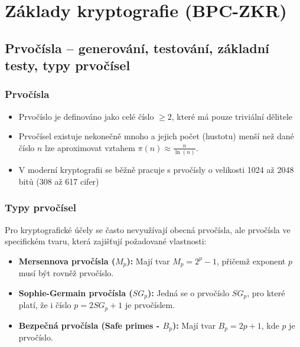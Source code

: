 \section{Základy kryptografie (BPC-ZKR)}
    \subsection{Prvočísla – generování, testování, základní testy, typy prvočísel}
        \subsubsection{Prvočísla}
            \begin{itemize}
                \item Prvočíslo je definováno jako celé číslo $\geq 2$, které má pouze triviální dělitele
                \item Prvočísel existuje nekonečně mnoho a jejich počet (hustotu) menší než dané číslo $n$ lze aproximovat vztahem $\pi(n) \approx \frac{n}{\ln(n)}$. 
                \item V moderní kryptografii se běžně pracuje s prvočísly o velikosti 1024 až 2048 bitů (308 až 617 cifer)
            \end{itemize}
        \subsubsection{Typy prvočísel}
            Pro kryptografické účely se často nevyužívají obecná prvočísla, ale prvočísla ve specifickém tvaru, která zajišťují požadované vlastnosti:
            \begin{itemize}
                \item \textbf{Mersennova prvočísla ($M_p$):} Mají tvar $M_p = 2^p - 1$, přičemž exponent $p$ musí být rovněž prvočíslo.
                \item \textbf{Sophie-Germain prvočísla ($SG_p$):} Jedná se o prvočíslo $SG_p$, pro které platí, že i číslo $p = 2SG_p + 1$ je prvočíslem.
                \item \textbf{Bezpečná prvočísla (Safe primes - $B_p$):} Mají tvar $B_p = 2p + 1$, kde $p$ je prvočíslo.
                \end{itemize}
